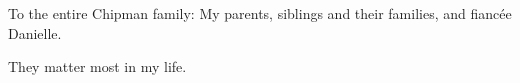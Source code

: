 To the entire Chipman family: My parents, siblings and their families, and fianc\'{e}e Danielle.  

They matter most in my life.